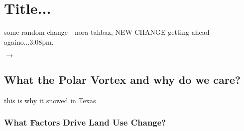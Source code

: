\chapter{Title...}


some random change - nora tahbaz, NEW CHANGE
 getting ahead againo...3:08pm.

$\rightarrow$

\section{What the Polar Vortex and why do we care?}

this is why it snowed in Texas

\subsection{What Factors Drive Land Use Change?}




